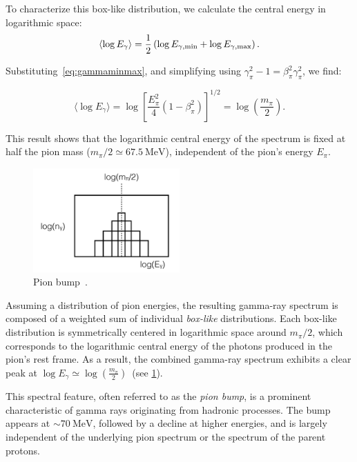 To characterize this box-like distribution, we calculate the central energy in logarithmic space:
\begin{equation}
\langle \log E_\gamma \rangle = \frac{1}{2} \left( \log E_{\gamma, \rm min} + \log E_{\gamma, \rm max} \right).
\end{equation}

Substituting~\cref{eq:gammaminmax}, and simplifying using \(\gamma_\pi^2 - 1 = \beta_\pi^2 \gamma_\pi^2\), we find:
\begin{remark}
\begin{equation}
\langle \log E_\gamma \rangle 
= \log \left[ \frac{E_\pi^2}{4} (1-\beta_\pi^2) \right]^{1/2} 
=\log \left( \frac{m_\pi}{2} \right).
\end{equation}
\end{remark}

This result shows that the logarithmic central energy of the spectrum is fixed at half the pion mass (\(m_\pi / 2 \simeq 67.5~\text{MeV}\)), independent of the pion's energy \(E_\pi\).

\begin{figure}[t]
\centering
\includegraphics[width=0.5\textwidth]{figures/pion_bump.png}
\caption{Pion bump~.}
\label{fig:pionbump}
\end{figure}

Assuming a distribution of pion energies, the resulting gamma-ray spectrum is composed of a weighted sum of individual \emph{box-like} distributions. Each box-like distribution is symmetrically centered in logarithmic space around \(m_\pi / 2\), which corresponds to the logarithmic central energy of the photons produced in the pion's rest frame. As a result, the combined gamma-ray spectrum exhibits a clear peak at \( \log E_\gamma \simeq \log \left(\frac{m_\pi}{2}\right) \)~(see \cref{fig:pionbump}).  

This spectral feature, often referred to as the \emph{pion bump}, is a prominent characteristic of gamma rays originating from hadronic processes. The bump appears at \(\sim 70~\text{MeV}\), followed by a decline at higher energies, and is largely independent of the underlying pion spectrum or the spectrum of the parent protons.  

